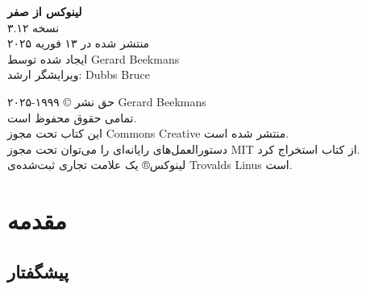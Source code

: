 \documentclass{book}
\begin{document}
\begin{center}
\textbf{لینوکس از صفر} \\ 
نسخه ۳.۱۲ \\ 
منتشر شده در ۱۳ فوریه ۲۰۲۵ \\ 
ایجاد شده توسط Gerard Beekmans \\ 
ویرایشگر ارشد: Dubbs Bruce \\ 
\end{center}

\newpage

\begin{center}
حق نشر © ۱۹۹۹-۲۰۲۵ Gerard Beekmans \\ 
تمامی حقوق محفوظ است. \\ 
این کتاب تحت مجوز Commons Creative منتشر شده است. \\ 
دستورالعمل‌های رایانه‌ای را می‌توان تحت مجوز MIT از کتاب استخراج کرد. \\ 
لینوکس® یک علامت تجاری ثبت‌شده‌ی Trovalds Linus است.
\end{center}

\chapter{مقدمه}
\newpage

\section{پیشگفتار}
\end{document}
